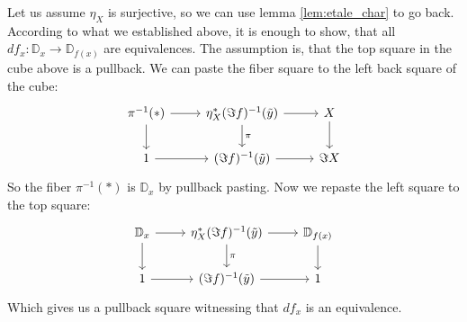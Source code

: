 \documentclass[9pt,twosided]{amsart}
\newcommand{\bD}{\mathbb D}
\begin{document}
Let us assume $\eta_X$ is surjective, so we can use lemma \ref{lem:etale_char} to go back.
According to what we established above, it is enough to show, that all $df_x:\bD_x\to \bD_{f(x)}$ are equivalences.
The assumption is, that the top square in the cube above is a pullback.
We can paste the fiber square to the left back square of the cube:
\begin{equation*}
  \begin{tikzcd}
      \pi^{-1}(\ast)\arrow[r]\arrow[d] & \eta_X^\ast(\Im f)^{-1}(\tilde{y})\arrow[r]\arrow[d, "\pi"] & X\arrow[d] \\
      1\arrow[r]                                & (\Im f)^{-1}(\tilde{y})\arrow[r] & \Im X
  \end{tikzcd}
\end{equation*}
So the fiber $\pi^{-1}(\ast)$ is $\bD_x$ by pullback pasting. Now we repaste the left square to the top square:
\begin{equation*}
  \begin{tikzcd}
      \bD_x\arrow[d]\arrow[r] & \eta_X^\ast(\Im f)^{-1}(\tilde{y})\arrow[r]\arrow[d, "\pi"] & \bD_{f(x)}\arrow[d] \\
      1\arrow[r]                                & (\Im f)^{-1}(\tilde{y})\arrow[r] & 1 
  \end{tikzcd}
\end{equation*}
Which gives us a pullback square witnessing that $df_x$ is an equivalence.  

\printbibliography
\end{document}
